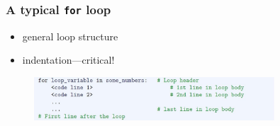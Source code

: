 \documentclass[english,14pt]{beamer}
\begin{document}

\begin{frame}[fragile]

\frametitle{A typical \texttt{for} loop}

\begin{itemize}
	\item general loop structure
	\item indentation---critical!
\end{itemize}

\begin{figure}[ht]
	\centering
	\includegraphics[width=0.8\textwidth]{figures/LLp60c}
\end{figure}



\end{frame}

\end{document}
